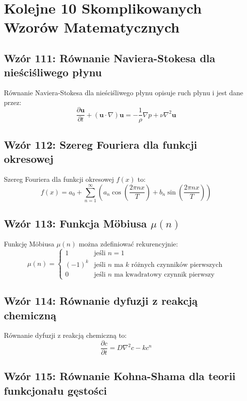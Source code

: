 \documentclass{article}
\begin{document}
\section*{Kolejne 10 Skomplikowanych Wzorów Matematycznych}

\subsection*{Wzór 111: Równanie Naviera-Stokesa dla nieściśliwego płynu}

Równanie Naviera-Stokesa dla nieściśliwego płynu opisuje ruch płynu i jest dane przez:
\[ \frac{\partial \mathbf{u}}{\partial t} + (\mathbf{u} \cdot \nabla) \mathbf{u} = -\frac{1}{\rho} \nabla p + \nu \nabla^2 \mathbf{u} \]

\subsection*{Wzór 112: Szereg Fouriera dla funkcji okresowej}

Szereg Fouriera dla funkcji okresowej \(f(x)\) to:
\[ f(x) = a_0 + \sum_{n=1}^{\infty} \left(a_n \cos\left(\frac{2\pi n x}{T}\right) + b_n \sin\left(\frac{2\pi n x}{T}\right)\right) \]

\subsection*{Wzór 113: Funkcja Möbiusa \(\mu(n)\)}

Funkcję Möbiusa \(\mu(n)\) można zdefiniować rekurencyjnie:
\[ \mu(n) = 
\begin{cases} 
1 & \text{jeśli } n = 1 \\
(-1)^k & \text{jeśli } n \text{ ma } k \text{ różnych czynników pierwszych} \\
0 & \text{jeśli } n \text{ ma kwadratowy czynnik pierwszy}
\end{cases}
\]

\subsection*{Wzór 114: Równanie dyfuzji z reakcją chemiczną}

Równanie dyfuzji z reakcją chemiczną to:
\[ \frac{\partial c}{\partial t} = D \nabla^2 c - k c^n \]

\subsection*{Wzór 115: Równanie Kohna-Shama dla teorii funkcjonału gęstości}
\end{document}
